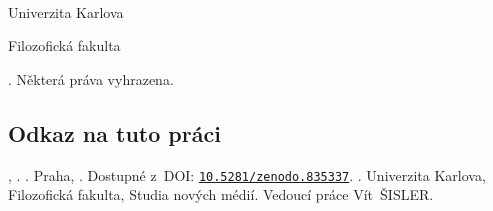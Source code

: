 \clearpage
\thispagestyle{empty}

~

\vfill

\noindent Univerzita Karlova

\noindent Filozofická fakulta

\noindent \textcopyright{} \the\year{} \theauthorGN{} \theauthorFN{}. Některá práva vyhrazena.


\subsection*{Odkaz na tuto práci}

\begin{flushleft}
\MakeUppercase{\theauthorFN{}}, \theauthorGN{}. \textit{\thetitle{}}. Praha, \the\year. Dostupné z~DOI: \texttt{\href{https://dx.doi.org/10.5281/zenodo.835337}{10.5281/zenodo.835337}}. \thesistype{}. Univerzita Karlova, Filozofická fakulta, Studia nových médií. Vedoucí práce Vít~ŠISLER.
\end{flushleft}


